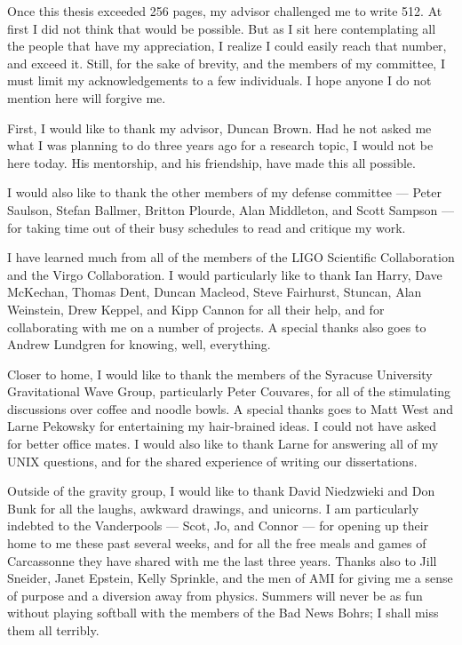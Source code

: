 Once this thesis exceeded 256 pages, my advisor challenged me to write 512. At
first I did not think that would be possible. But as I sit here contemplating
all the people that have my appreciation, I realize I could easily reach that
number, and exceed it. Still, for the sake of brevity, and the members of my
committee, I must limit my acknowledgements to a few individuals. I hope anyone
I do not mention here will forgive me.

First, I would like to thank my advisor, Duncan Brown. Had he not asked me what
I was planning to do three years ago for a research topic, I would not be here
today. His mentorship, and his friendship, have made this all possible.

I would also like to thank the other members of my defense committee --- Peter
Saulson, Stefan Ballmer, Britton Plourde, Alan Middleton, and Scott Sampson ---
for taking time out of their busy schedules to read and critique my work.

I have learned much from all of the members of the LIGO Scientific
Collaboration and the Virgo Collaboration. I would particularly like to thank
Ian Harry, Dave McKechan, Thomas Dent, Duncan Macleod, Steve Fairhurst,
Stuncan, Alan Weinstein, Drew Keppel, and Kipp Cannon for all their help, and
for collaborating with me on a number of projects. A special thanks also goes
to Andrew Lundgren for knowing, well, everything.

Closer to home, I would like to thank the members of the Syracuse University
Gravitational Wave Group, particularly Peter Couvares, for all of the
stimulating discussions over coffee and noodle bowls. A special thanks goes to
Matt West and Larne Pekowsky for entertaining my hair-brained ideas. I could
not have asked for better office mates. I would also like to thank Larne for
answering all of my UNIX questions, and for the shared experience of writing
our dissertations.

Outside of the gravity group, I would like to thank David Niedzwieki and Don
Bunk for all the laughs, awkward drawings, and unicorns. I am particularly
indebted to the Vanderpools --- Scot, Jo, and Connor --- for opening up their
home to me these past several weeks, and for all the free meals and games of
Carcassonne they have shared with me the last three years. Thanks also to Jill
Sneider, Janet Epstein, Kelly Sprinkle, and the men of AMI for giving me a
sense of purpose and a diversion away from physics. Summers will never be as
fun without playing softball with the members of the Bad News Bohrs; I shall
miss them all terribly.

